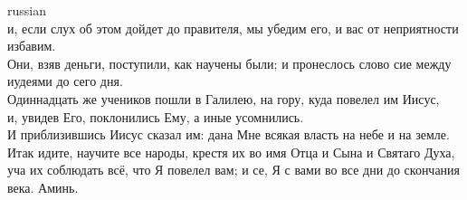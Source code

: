 \documentclass[10pt]{article} %
\begin{document}
{\begin{minipage}[t]{0.45\textwidth}
\begin{otherlanguage*}{russian}
\\
и, если слух об этом дойдет до правителя, мы убедим его, и вас от неприятности избавим.
\\
Они, взяв деньги, поступили, как научены были; и пронеслось слово сие между иудеями до сего дня.
\\
Одиннадцать же учеников пошли в Галилею, на гору, куда повелел им Иисус,
\\
и, увидев Его, поклонились Ему, а иные усомнились.
\\
И приблизившись Иисус сказал им: дана Мне всякая власть на небе и на земле.
\\
Итак идите, научите все народы, крестя их во имя Отца и Сына и Святаго Духа,
\\
уча их соблюдать всё, что Я повелел вам; и се, Я с вами во все дни до скончания века. Аминь.
\end{otherlanguage*}
\end{minipage}
\hfill
\begin{minipage}[t]{0.45\textwidth}


\end{minipage}}
\end{document}
